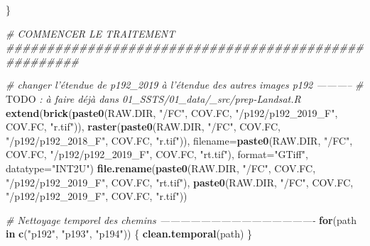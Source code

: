 \documentclass[a4paper, notitlepage, 12pt, krantz2]{krantz}
\newenvironment{Shaded}{\begin{snugshade}}{\end{snugshade}}
\newcommand{\AlertTok}[1]{\textcolor[rgb]{0.94,0.16,0.16}{#1}}
\newcommand{\CommentTok}[1]{\textcolor[rgb]{0.56,0.35,0.01}{\textit{#1}}}
\newcommand{\ControlFlowTok}[1]{\textcolor[rgb]{0.13,0.29,0.53}{\textbf{#1}}}
\newcommand{\DataTypeTok}[1]{\textcolor[rgb]{0.13,0.29,0.53}{#1}}
\newcommand{\KeywordTok}[1]{\textcolor[rgb]{0.13,0.29,0.53}{\textbf{#1}}}
\newcommand{\NormalTok}[1]{#1}
\newcommand{\StringTok}[1]{\textcolor[rgb]{0.31,0.60,0.02}{#1}}
\begin{document}
\begin{Shaded}
\begin{Highlighting}[]
{{{\NormalTok{\}}


\CommentTok{# COMMENCER LE TRAITEMENT #####################################################}

\CommentTok{# changer l'étendue de p192_2019 à l'étendue des autres images p192 -----------}
\CommentTok{# }\AlertTok{TODO}\CommentTok{ : à faire déjà dans 01_SSTS/01_data/_src/prep-Landsat.R}
\KeywordTok{extend}\NormalTok{(}\KeywordTok{brick}\NormalTok{(}\KeywordTok{paste0}\NormalTok{(RAW.DIR, }\StringTok{"/FC"}\NormalTok{, COV.FC, }\StringTok{"/p192/p192_2019_F"}\NormalTok{, COV.FC, }\StringTok{"r.tif"}\NormalTok{)), }\KeywordTok{raster}\NormalTok{(}\KeywordTok{paste0}\NormalTok{(RAW.DIR, }\StringTok{"/FC"}\NormalTok{, COV.FC, }\StringTok{"/p192/p192_2018_F"}\NormalTok{, COV.FC, }\StringTok{"r.tif"}\NormalTok{)), }
       \DataTypeTok{filename=}\KeywordTok{paste0}\NormalTok{(RAW.DIR, }\StringTok{"/FC"}\NormalTok{, COV.FC, }\StringTok{"/p192/p192_2019_F"}\NormalTok{, COV.FC, }\StringTok{"rt.tif"}\NormalTok{), }\DataTypeTok{format=}\StringTok{"GTiff"}\NormalTok{, }\DataTypeTok{datatype=}\StringTok{"INT2U"}\NormalTok{)}
\KeywordTok{file.rename}\NormalTok{(}\KeywordTok{paste0}\NormalTok{(RAW.DIR, }\StringTok{"/FC"}\NormalTok{, COV.FC, }\StringTok{"/p192/p192_2019_F"}\NormalTok{, COV.FC, }\StringTok{"rt.tif"}\NormalTok{), }\KeywordTok{paste0}\NormalTok{(RAW.DIR, }\StringTok{"/FC"}\NormalTok{, COV.FC, }\StringTok{"/p192/p192_2019_F"}\NormalTok{, COV.FC, }\StringTok{"r.tif"}\NormalTok{))}

\CommentTok{# Nettoyage temporel des chemins ----------------------------------------------}
\ControlFlowTok{for}\NormalTok{(path }\ControlFlowTok{in} \KeywordTok{c}\NormalTok{(}\StringTok{"p192"}\NormalTok{, }\StringTok{"p193"}\NormalTok{, }\StringTok{"p194"}\NormalTok{)) \{}
  \KeywordTok{clean.temporal}\NormalTok{(path)}
\NormalTok{\} }

}}}
\end{Highlighting}
\end{Shaded}
\end{document}
